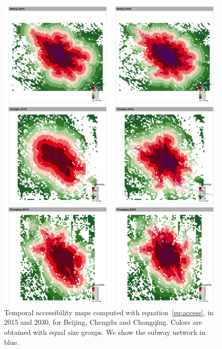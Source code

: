 \documentclass{article}
\begin{document}
\begin{figure}
	\includegraphics[width=\linewidth]{figures/Fig1a.png}
	\caption{Temporal accessibility maps computed with equation~\ref{eq:access}, in 2015 and 2030, for Beijing, Chengdu and Chongqing. Colors are obtained with equal size groups. We show the subway network in blue.\label{fig:fig1}}
\end{figure}
\end{document}
